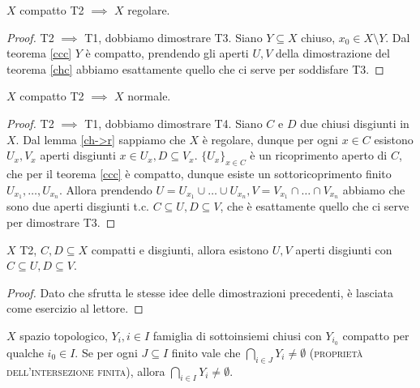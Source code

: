 \begin{lm} \label{ch->r}
  $X$ compatto T2 $\implies$ $X$ regolare.
\end{lm}

\begin{proof}
  T2 $\implies$ T1, dobbiamo dimostrare T3. Siano $Y \subseteq X$ chiuso, $x_0 \in X \setminus Y$. Dal teorema \ref{ccc} $Y$ è compatto, prendendo gli aperti $U, V$ della dimostrazione del teorema \ref{chc} abbiamo esattamente quello che ci serve per soddisfare T3.
\end{proof}

\begin{thm} \label{ch->n}
  $X$ compatto T2 $\implies$ $X$ normale.
\end{thm}

\begin{proof}
  T2 $\implies$ T1, dobbiamo dimostrare T4. Siano $C$ e $D$ due chiusi disgiunti in $X$. Dal lemma \ref{ch->r} sappiamo che $X$ è regolare, dunque per ogni $x \in C$ esistono $U_x, V_x$ aperti disgiunti $x \in U_x, D \subseteq V_x$. $\{U_x\}_{x \in C}$ è un ricoprimento aperto di $C$, che per il teorema \ref{ccc} è compatto, dunque esiste un sottoricoprimento finito $U_{x_1}, \dots, U_{x_n}$.
  Allora prendendo $U=U_{x_1} \cup \dots \cup U_{x_n}, V=V_{x_1} \cap \dots \cap V_{x_n}$ abbiamo che sono due aperti disgiunti t.c. $C \subseteq U, D \subseteq V$, che è esattamente quello che ci serve per dimostrare T3.
\end{proof}

\begin{prop}
  $X$ T2, $C, D \subseteq X$ compatti e disgiunti, allora esistono $U, V$ aperti disgiunti con $C \subseteq U, D \subseteq V$.
\end{prop}

\begin{proof}
  Dato che sfrutta le stesse idee delle dimostrazioni precedenti, è lasciata come esercizio al lettore.
\end{proof}

\begin{thm} \label{pif}
  $X$ spazio topologico, $Y_i, i \in I$ famiglia di sottoinsiemi chiusi con $Y_{i_0}$ compatto per qualche $i_0 \in I$. Se per ogni $J \subseteq I$ finito vale che $\displaystyle \bigcap_{i \in J} Y_i \not = \emptyset$ (\textsc{proprietà dell'intersezione finita}), allora $\displaystyle \bigcap_{i \in I} Y_i \not=\emptyset$.
\end{thm}

